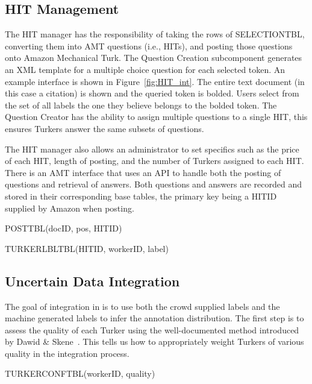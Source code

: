 \subsection{HIT Management}

The HIT manager has the responsibility of taking the rows of S{\small ELECTION}T{\small BL}, converting them into AMT questions (i.e., HITs), and posting those questions onto Amazon Mechanical Turk. The Question Creation subcomponent generates an XML template for a multiple choice question for each selected token. An example interface is shown in Figure~\ref{fig:HIT_int}. The entire text document (in this case a citation) is shown and the queried token is bolded.  Users select from the set of all labels the one they believe belongs to the bolded token. The Question Creator has the ability to assign multiple questions to a single HIT, this ensures Turkers answer the same subsets of questions.

The HIT manager also allows an administrator to set specifics such as the price of each HIT, length of posting, and the number of Turkers assigned to each HIT.  There is an AMT interface that uses an API to handle both the posting of questions and retrieval of answers. Both questions and answers are recorded and stored in their corresponding base tables, the primary key being a HITID supplied by Amazon when posting.

\vspace{.1in}
\centerline{P{\small OST}T{\small BL}(docID, pos, HITID)}
\vspace{.1in}

\centerline{T{\small URKER}L{\small BL}T{\small BL}(HITID, workerID, label)}
\vspace{.1in}

\subsection{Uncertain Data Integration}

The goal of integration in \sysName is to use both the crowd supplied labels and the machine generated labels to infer the annotation distribution. The first step is to assess the quality of each Turker using the well-documented method introduced by Dawid \& Skene~\cite{1979}.  This tells us how to appropriately weight Turkers of various quality in the integration process.

\vspace{.1in}
\centerline{T{\small URKER}C{\small ONF}T{\small BL}(workerID, quality)}
\vspace{.1in}

